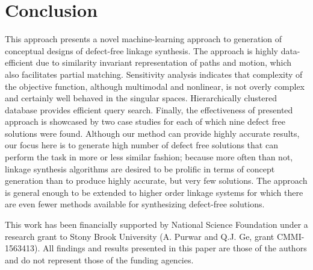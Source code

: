 \documentclass[twocolumn,10pt]{asme2ej}
\begin{document}
\section*{Conclusion}
This approach presents a novel machine-learning approach to generation of conceptual designs of defect-free linkage synthesis.
The approach is highly data-efficient due to similarity invariant representation of paths and motion, which also facilitates partial matching.
Sensitivity analysis indicates that complexity of the objective function, although multimodal and nonlinear, is not overly complex and certainly well behaved in the singular spaces.
Hierarchically clustered database provides efficient query search.
Finally, the effectiveness of presented approach is showcased by two case studies for each of which nine defect free solutions were found.
Although our method can provide highly accurate results, our focus here is to generate high number of defect free solutions that can perform the task in more or less similar fashion;
because more often than not, linkage synthesis algorithms are desired to be prolific in terms of concept generation than to produce highly accurate, but very few solutions. The approach is general enough to be extended to higher order linkage systems for which there are even fewer methods available for synthesizing defect-free solutions.

\begin{acknowledgment}
This work has been financially supported by National Science Foundation under a research grant to Stony Brook University (A. Purwar and Q.J. Ge, grant CMMI-1563413). All findings and results presented in this paper are those of the authors and do not represent those of the funding agencies.
\end{acknowledgment}



\newpage
\clearpage
\listoftables
\listoffigures
\end{document}
